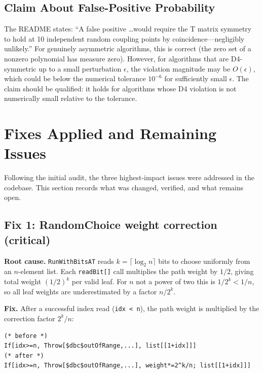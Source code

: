 \documentclass[12pt,a4paper]{article}
\theoremstyle{critical}
\theoremstyle{remark}
\begin{document}
\subsection{Claim About False-Positive Probability}

The README states: ``A false positive \ldots would require the T matrix symmetry to hold
at 10 independent random coupling points by coincidence---negligibly unlikely.'' For
genuinely asymmetric algorithms, this is correct (the zero set of a nonzero polynomial
has measure zero). However, for algorithms that are D4-symmetric up to a small
perturbation $\epsilon$, the violation magnitude may be $O(\epsilon)$, which could be
below the numerical tolerance $10^{-6}$ for sufficiently small $\epsilon$. The claim
should be qualified: it holds for algorithms whose D4 violation is not numerically small
relative to the tolerance.

\section{Fixes Applied and Remaining Issues}
\label{sec:fixes}

Following the initial audit, the three highest-impact issues were addressed in the
codebase. This section records what was changed, verified, and what remains open.

\subsection{Fix 1: RandomChoice weight correction (critical)}

\textbf{Root cause.}
\texttt{RunWithBitsAT} reads $k = \lceil\log_2 n\rceil$ bits to choose uniformly from
an $n$-element list. Each \texttt{readBit[]} call multiplies the path weight by $1/2$,
giving total weight $(1/2)^k$ per valid leaf. For $n$ not a power of two this is
$1/2^k < 1/n$, so all leaf weights are underestimated by a factor $n/2^k$.

\textbf{Fix.}
After a successful index read (\texttt{idx < n}), the path weight is multiplied by
the correction factor $2^k/n$:

\begin{lstlisting}
(* before *)
If[idx>=n, Throw[$dbc$outOfRange,...], list[[1+idx]]]
(* after *)
If[idx>=n, Throw[$dbc$outOfRange,...], weight*=2^k/n; list[[1+idx]]]
\end{lstlisting}
\end{document}
